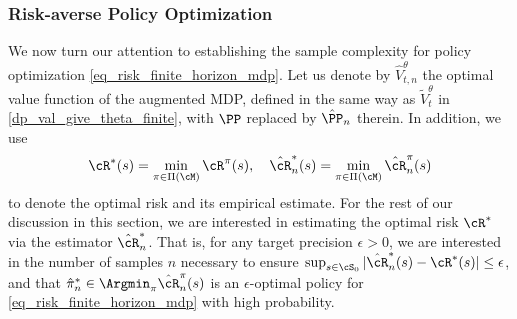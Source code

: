 \documentclass[9pt]{article}
\numberwithin{equation}{section}
\begin{document}
\subsubsection{Risk-averse Policy Optimization}\label{sec_mdp_sample_finite_opt}
We now turn our attention to establishing the sample complexity for policy optimization \eqref{eq_risk_finite_horizon_mdp}.
Let us denote by $\hat{V}_{t,n}^\theta$ the optimal value function of the augmented MDP, defined in the same way as $\tilde{V}^\theta_t$ in  \eqref{dp_val_give_theta_finite}, with $\PP$ replaced by $\hat{\PP}_n$ therein.
In addition, we use  
\begin{align}\label{mdp_opt_risk_empirical}
    \cR^*(s) = \min_{\pi \in \Pi(\cM)} \cR^\pi(s), ~~~ \hat{\cR}^*_n(s) =  \min_{\pi \in \Pi(\cM)} \hat\cR_{n}^\pi(s)
\end{align}
to denote the optimal risk and its empirical estimate.
For the rest of our discussion in this section, we are interested in estimating the optimal risk $\cR^*$  via the estimator $\hat{\cR}^*_n$.
That is, for  any target precision $\epsilon > 0$, we are interested in the number of samples $n$ necessary to ensure 
$\sup_{s \in \cS_0} |{ \hat{\cR}^*_n(s) - \cR^*(s)}| \leq \epsilon$,
and that $\hat{\pi}^*_n \in \Argmin_{\pi} \hat{\cR}_n^\pi(s)$ is an $\epsilon$-optimal policy for \eqref{eq_risk_finite_horizon_mdp} with high probability. 
\end{document}
